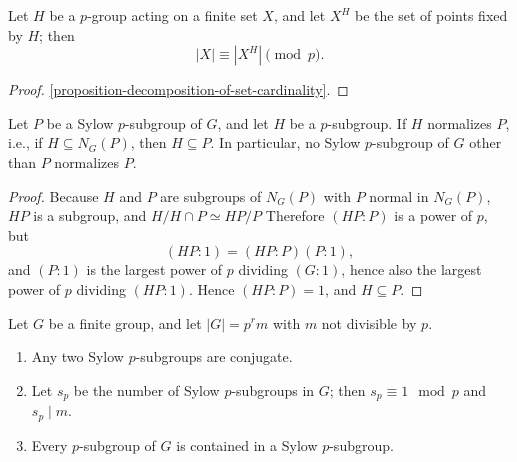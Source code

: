 \begin{lemma}
  \label{lemma-Sylow-II-1}
  Let \( H \) be a \( p \)-group acting on a finite set \( X \), and let \( X^H \) be the set of points fixed by \( H \);
  then
  \[
    \left\vert X \right\vert \equiv \left\vert X^H \right\vert \pmod{p}.
  \]
\end{lemma}
\begin{proof}
  \ref{proposition-decomposition-of-set-cardinality}.
\end{proof}

\begin{lemma}
  \label{lemma-Sylow-II-2}
  Let \( P \) be a Sylow \( p \)-subgroup of \( G \), and let \( H \) be a \( p \)-subgroup.
  If \( H \) normalizes \( P \), i.e., if \( H \subseteq N_G(P) \), then \( H \subseteq P \).
  In particular, no Sylow \( p \)-subgroup of \( G \) other than \( P \) normalizes \( P \).
\end{lemma}
\begin{proof}
  Because \( H \) and \( P \) are subgroups of \( N_G(P) \) with \( P \) normal in \( N_G(P) \), \( HP \) is a subgroup, and \( H / H \cap P \simeq HP / P \)
  Therefore \( (HP : P) \) is a power of \( p \), but
  \[
    (HP : 1) = (HP : P)(P : 1),
  \]
  and \( (P : 1) \) is the largest power of \( p \) dividing \( (G : 1) \), hence also the largest power of \( p \) dividing \( (HP : 1) \).
  Hence \( (HP : P) = 1 \), and \( H \subseteq P \).
\end{proof}

\begin{theorem}[Sylow II]
  \label{theorem-Sylow-II}
  Let \( G \) be a finite group, and let \( \left\vert G \right\vert = p^r m \) with \( m \) not divisible by \( p \).
  \begin{enumerate}
    \item Any two Sylow \( p \)-subgroups are conjugate.
    \item Let \( s_p \) be the number of Sylow \( p \)-subgroups in \( G \);
      then \( s_p \equiv 1 \mod{p} \) and \( s_p \mid m \).
    \item Every \( p \)-subgroup of \( G \) is contained in a Sylow \( p \)-subgroup.
  \end{enumerate}
\end{theorem}

